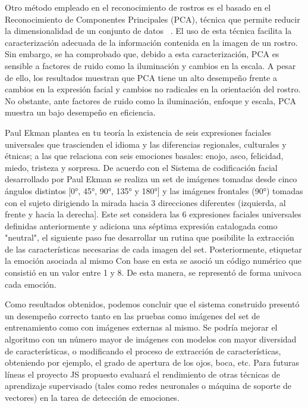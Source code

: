 Otro método empleado en el reconocimiento de rostros es el basado en el Reconocimiento de Componentes Principales (PCA), técnica que permite reducir la dimensionalidad de un conjunto de datos ~\cite{D4}. El uso de esta técnica facilita la caracterización adecuada de la información contenida en la imagen de un rostro. Sin embargo, se ha comprobado que, debido a esta caracterización, PCA es sensible a factores de ruido como la iluminación y cambios en la escala. A pesar de ello, los resultados muestran que PCA tiene un alto desempeño frente a cambios en la expresión facial y cambios no radicales en la orientación del rostro. No obstante, ante factores de ruido como la iluminación, enfoque y escala, PCA muestra un bajo desempeño en eficiencia. 

Paul Ekman plantea en tu teoría la existencia de seis expresiones faciales universales que trascienden el idioma y las diferencias regionales, culturales y étnicas; a las que relaciona con seis emociones basales: enojo, asco, felicidad, miedo, tristeza y sorpresa. De acuerdo con el Sistema de codificación facial ~\cite{Website} desarrollado por Paul Ekman se realiza un set de imágenes tomadas desde cinco ángulos distintos [0°, 45°, 90°, 135° y 180°] y las imágenes frontales (90°) tomadas con el sujeto dirigiendo la mirada hacia 3 direcciones diferentes (izquierda, al frente y hacia la derecha]. Este set considera las 6 expresiones faciales universales definidas anteriormente y adiciona una séptima expresión catalogada como "neutral", el siguiente paso fue desarrollar un rutina que posibilite la extracción de las características necesarias de cada imagen del set. 
Posteriormente, etiquetar la emoción asociada al mismo Con base en esta se asoció un código numérico que consistió en un valor entre 1 y 8. De esta manera, se representó de forma univoca cada emoción. 

Como resultados obtenidos, podemos concluir que el sistema construido presentó un desempeño correcto tanto en las pruebas como imágenes del set de entrenamiento como con imágenes externas al mismo. Se podría mejorar el algoritmo con un número mayor de imágenes con modelos con mayor diversidad de características, o modificando el proceso de extracción de características, obteniendo por ejemplo, el grado de apertura de los ojos, boca, etc. 
Para futuras líneas el proyecto JS propuesto evaluará el rendimiento de otras técnicas de aprendizaje supervisado (tales como redes neuronales o máquina de soporte de vectores) en la tarea de detección de emociones. 

